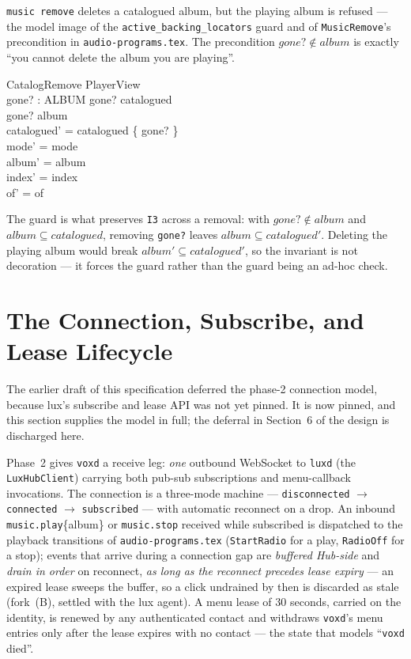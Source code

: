 \documentclass[a4paper,10pt,fleqn]{article}
\begin{document}
\texttt{music remove} deletes a catalogued album, but the playing album is
refused --- the model image of the \texttt{active\_backing\_locators} guard and of
\texttt{MusicRemove}'s precondition in \texttt{audio-programs.tex}. The
precondition $gone? \notin album$ is exactly ``you cannot delete the album you
are playing''.

\begin{schema}{CatalogRemove}
  \Delta PlayerView \\
  gone? : ALBUM
  \where
  gone? \in catalogued \\
  gone? \notin album \\
  catalogued' = catalogued \setminus \{ gone? \} \\
  mode' = mode \\
  album' = album \\
  index' = index \\
  of' = of
\end{schema}

The guard is what preserves \texttt{I3} across a removal: with $gone? \notin
album$ and $album \subseteq catalogued$, removing \texttt{gone?} leaves
$album \subseteq catalogued'$. Deleting the playing album would break
$album' \subseteq catalogued'$, so the invariant is not decoration --- it forces
the guard rather than the guard being an ad-hoc check.

\section{The Connection, Subscribe, and Lease Lifecycle}
\label{sec:conn}

The earlier draft of this specification deferred the phase-2 connection model,
because lux's subscribe and lease API was not yet pinned. It is now pinned, and
this section supplies the model in full; the deferral in Section~6 of the design
is discharged here.

Phase~2 gives \texttt{voxd} a receive leg: \emph{one} outbound WebSocket to
\texttt{luxd} (the \texttt{LuxHubClient}) carrying both pub-sub subscriptions and
menu-callback invocations. The connection is a three-mode machine ---
\texttt{disconnected} $\to$ \texttt{connected} $\to$ \texttt{subscribed} --- with
automatic reconnect on a drop. An inbound \texttt{music.play}\{album\} or
\texttt{music.stop} received while subscribed is dispatched to the playback
transitions of \texttt{audio-programs.tex} (\texttt{StartRadio} for a play,
\texttt{RadioOff} for a stop); events that arrive during a connection gap are
\emph{buffered Hub-side} and \emph{drain in order} on reconnect, \emph{as long as
the reconnect precedes lease expiry} --- an expired lease sweeps the buffer, so a
click undrained by then is discarded as stale (fork~(B), settled with the lux
agent). A menu lease of $30$ seconds, carried on the identity, is renewed by any
authenticated contact and withdraws \texttt{voxd}'s menu entries only after the
lease expires with no contact --- the state that models ``\texttt{voxd} died''.
\end{document}
